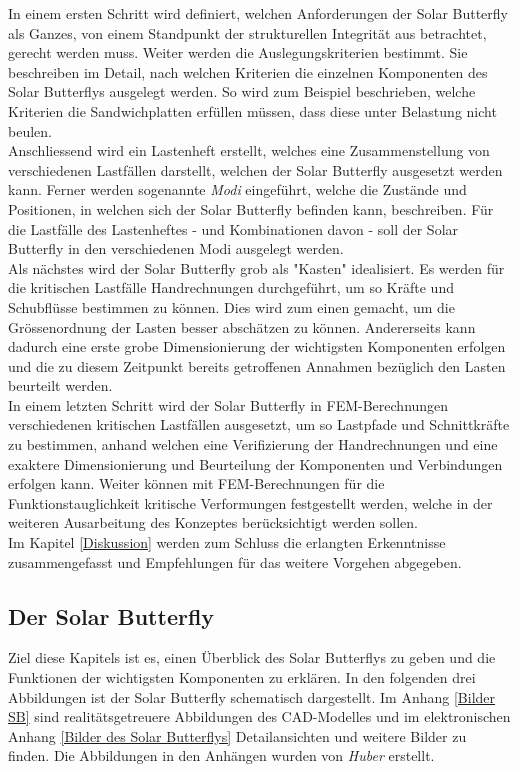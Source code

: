 In einem ersten Schritt wird definiert, welchen Anforderungen der Solar Butterfly als Ganzes, von einem Standpunkt der strukturellen Integrität aus betrachtet, gerecht werden muss. Weiter werden die Auslegungskriterien bestimmt. Sie beschreiben im Detail, nach welchen Kriterien die einzelnen Komponenten des Solar Butterflys ausgelegt werden. So wird zum Beispiel beschrieben, welche Kriterien die Sandwichplatten erfüllen müssen, dass diese unter Belastung nicht beulen.\\
Anschliessend wird ein Lastenheft erstellt, welches eine Zusammenstellung von verschiedenen Lastfällen darstellt, welchen der Solar Butterfly ausgesetzt werden kann. Ferner werden sogenannte \emph{Modi} eingeführt, welche die Zustände und Positionen, in welchen sich der Solar Butterfly befinden kann, beschreiben. Für die Lastfälle des Lastenheftes - und Kombinationen davon - soll der Solar Butterfly in den verschiedenen Modi ausgelegt werden.\\
Als nächstes wird der Solar Butterfly grob als "Kasten" idealisiert. Es werden für die kritischen Lastfälle Handrechnungen durchgeführt, um so Kräfte und Schubflüsse bestimmen zu können. Dies wird zum einen gemacht, um die Grössenordnung der Lasten besser abschätzen zu können. Andererseits kann dadurch eine erste grobe Dimensionierung der wichtigsten Komponenten erfolgen und die zu diesem Zeitpunkt bereits getroffenen Annahmen bezüglich den Lasten beurteilt werden.\\
In einem letzten Schritt wird der Solar Butterfly in FEM-Berechnungen verschiedenen kritischen Lastfällen ausgesetzt, um so Lastpfade und Schnittkräfte zu bestimmen, anhand welchen eine Verifizierung der Handrechnungen und eine exaktere Dimensionierung und Beurteilung der Komponenten und Verbindungen erfolgen kann. Weiter können mit FEM-Berechnungen für die Funktionstauglichkeit kritische Verformungen festgestellt werden, welche in der weiteren Ausarbeitung des Konzeptes berücksichtigt werden sollen.\\
Im Kapitel \ref{Diskussion} werden zum Schluss die erlangten Erkenntnisse zusammengefasst und Empfehlungen für das weitere Vorgehen abgegeben.

\subsection{Der Solar Butterfly}
Ziel diese Kapitels ist es, einen Überblick des Solar Butterflys zu geben und die Funktionen der wichtigsten Komponenten zu erklären.
In den folgenden drei Abbildungen ist der Solar Butterfly schematisch dargestellt. Im Anhang \ref{Bilder SB} sind realitätsgetreuere Abbildungen des CAD-Modelles und im elektronischen Anhang \ref{Bilder des Solar Butterflys} Detailansichten und weitere Bilder zu finden. Die Abbildungen in den Anhängen wurden von \emph{Huber} erstellt.

